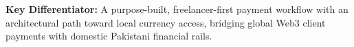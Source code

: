 \documentclass[aspectratio=169, 10pt, t]{beamer}
\begin{document}
\begin{frame}[plain]
\begin{tcbitemize}
  \end{tcbitemize}

  \vspace{0.20cm}

  \begin{tcolorbox}[colframe=hmLightBorder, colback=hmWhite, boxrule=0.75pt, leftrule=3.5pt,
    borderline west={3.5pt}{0pt}{hmYellow}, rounded corners, left=9pt, right=9pt, top=5pt, bottom=5pt,
    enhanced, drop fuzzy shadow=gray!10]
    \noindent\textbf{\fontsize{7.5}{9.5}\selectfont\textcolor{hmYellowDark}{Key Differentiator:}} 
    {\fontsize{7.2}{9.2}\selectfont\textcolor{hmSlateDark}{A purpose-built, freelancer-first payment workflow with an architectural path toward local currency access, bridging global Web3 client payments with domestic Pakistani financial rails.}}
  \end{tcolorbox}

\end{frame}
\end{document}
